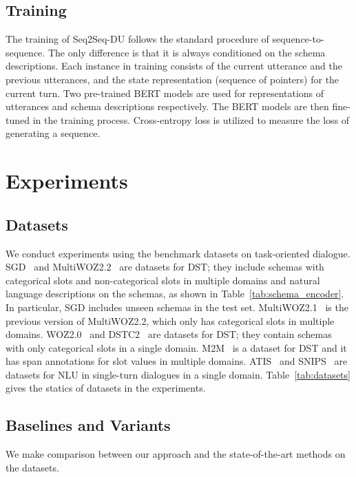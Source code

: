 \documentclass[11pt]{article}
\begin{document}
\subsection{Training}

The training of Seq2Seq-DU follows the standard procedure of sequence-to-sequence. The only difference is that it is always conditioned on the schema descriptions.  Each instance in training consists of the current utterance and the previous utterances, and the state representation (sequence of pointers) for the current turn.  Two pre-trained BERT models are used for representations of utterances and schema descriptions respectively. The BERT models are then fine-tuned in the training process. Cross-entropy loss is utilized to measure the loss of generating a sequence.


\section{Experiments}


\subsection{Datasets}
We conduct experiments using the benchmark datasets on task-oriented dialogue. SGD~\citep{rastogi2019towards} and MultiWOZ2.2~\citep{zang2020multiwoz} are datasets for DST; they include schemas with categorical slots and non-categorical slots in multiple domains and natural language descriptions on the schemas, as shown in Table~\ref{tab:schema_encoder}. In particular, SGD includes unseen schemas in the test set. 
MultiWOZ2.1~\citep{eric2020multiwoz} is the previous version of MultiWOZ2.2, which only has categorical slots in multiple domains.
WOZ2.0~\citep{wen2016network} and DSTC2~\citep{henderson2014second} are datasets for DST; they contain schemas with only categorical slots in a single domain. M2M~\citep{shah2018building} is a dataset for DST and it has span annotations for slot values in multiple domains. ATIS~\citep{tur2010left} and SNIPS~\citep{coucke2018snips} are datasets for NLU in single-turn dialogues in a single domain. Table~\ref{tab:datasets} gives the statics of datasets in the experiments.




\subsection{Baselines and Variants}
We make comparison between our approach and the state-of-the-art methods on the datasets.
\end{document}
